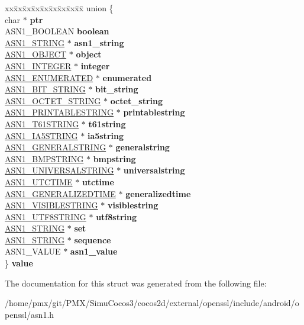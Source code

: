 \begin{DoxyCompactItemize}
\begin{tabbing}
\end{tabbing}\item 
\mbox{\label{structasn1__type__st_a54daf12834b9514feb5d4b7b1600760c}} 
\begin{tabbing}
xx\=xx\=xx\=xx\=xx\=xx\=xx\=xx\=xx\=\kill
union \{\\
\>char $\ast$ {\bfseries ptr}\\
\>ASN1\_BOOLEAN {\bfseries boolean}\\
\>\hyperlink{structasn1__string__st}{ASN1\_STRING} $\ast$ {\bfseries asn1\_string}\\
\>\hyperlink{structasn1__object__st}{ASN1\_OBJECT} $\ast$ {\bfseries object}\\
\>\hyperlink{structasn1__string__st}{ASN1\_INTEGER} $\ast$ {\bfseries integer}\\
\>\hyperlink{structasn1__string__st}{ASN1\_ENUMERATED} $\ast$ {\bfseries enumerated}\\
\>\hyperlink{structasn1__string__st}{ASN1\_BIT\_STRING} $\ast$ {\bfseries bit\_string}\\
\>\hyperlink{structasn1__string__st}{ASN1\_OCTET\_STRING} $\ast$ {\bfseries octet\_string}\\
\>\hyperlink{structasn1__string__st}{ASN1\_PRINTABLESTRING} $\ast$ {\bfseries printablestring}\\
\>\hyperlink{structasn1__string__st}{ASN1\_T61STRING} $\ast$ {\bfseries t61string}\\
\>\hyperlink{structasn1__string__st}{ASN1\_IA5STRING} $\ast$ {\bfseries ia5string}\\
\>\hyperlink{structasn1__string__st}{ASN1\_GENERALSTRING} $\ast$ {\bfseries generalstring}\\
\>\hyperlink{structasn1__string__st}{ASN1\_BMPSTRING} $\ast$ {\bfseries bmpstring}\\
\>\hyperlink{structasn1__string__st}{ASN1\_UNIVERSALSTRING} $\ast$ {\bfseries universalstring}\\
\>\hyperlink{structasn1__string__st}{ASN1\_UTCTIME} $\ast$ {\bfseries utctime}\\
\>\hyperlink{structasn1__string__st}{ASN1\_GENERALIZEDTIME} $\ast$ {\bfseries generalizedtime}\\
\>\hyperlink{structasn1__string__st}{ASN1\_VISIBLESTRING} $\ast$ {\bfseries visiblestring}\\
\>\hyperlink{structasn1__string__st}{ASN1\_UTF8STRING} $\ast$ {\bfseries utf8string}\\
\>\hyperlink{structasn1__string__st}{ASN1\_STRING} $\ast$ {\bfseries set}\\
\>\hyperlink{structasn1__string__st}{ASN1\_STRING} $\ast$ {\bfseries sequence}\\
\>ASN1\_VALUE $\ast$ {\bfseries asn1\_value}\\
\} {\bfseries value}\\

\end{tabbing}\end{DoxyCompactItemize}


The documentation for this struct was generated from the following file\+:\begin{DoxyCompactItemize}
\item 
/home/pmx/git/\+P\+M\+X/\+Simu\+Cocos3/cocos2d/external/openssl/include/android/openssl/asn1.\+h\end{DoxyCompactItemize}
